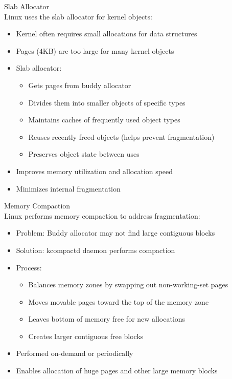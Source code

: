 \begin{definition}{Slab Allocator}\\
    Linux uses the slab allocator for kernel objects:
    \begin{itemize}
        \item Kernel often requires small allocations for data structures
        \item Pages (4KB) are too large for many kernel objects
        \item Slab allocator:
            \begin{itemize}
                \item Gets pages from buddy allocator
                \item Divides them into smaller objects of specific types
                \item Maintains caches of frequently used object types
                \item Reuses recently freed objects (helps prevent fragmentation)
                \item Preserves object state between uses
            \end{itemize}
        \item Improves memory utilization and allocation speed
        \item Minimizes internal fragmentation
    \end{itemize}
\end{definition}

\begin{definition}{Memory Compaction}\\
    Linux performs memory compaction to address fragmentation:
    \begin{itemize}
        \item Problem: Buddy allocator may not find large contiguous blocks
        \item Solution: kcompactd daemon performs compaction
        \item Process:
            \begin{itemize}
                \item Balances memory zones by swapping out non-working-set pages
                \item Moves movable pages toward the top of the memory zone
                \item Leaves bottom of memory free for new allocations
                \item Creates larger contiguous free blocks
            \end{itemize}
        \item Performed on-demand or periodically
        \item Enables allocation of huge pages and other large memory blocks
    \end{itemize}
\end{definition}

